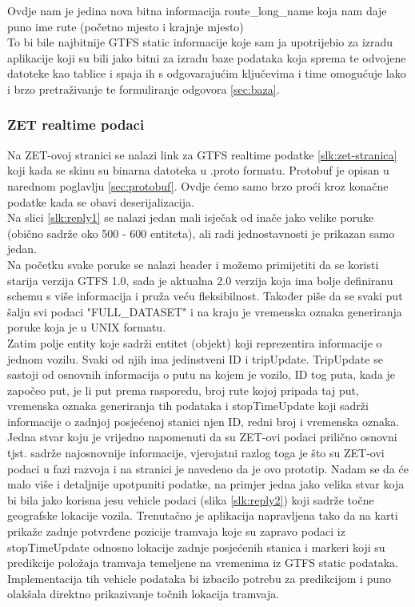 \documentclass[zavrsnirad]{fer}
\begin{document}
Ovdje nam je jedina nova bitna informacija route\_long\_name koja nam daje puno ime rute (početno mjesto i krajnje mjesto)\\
To bi bile najbitnije GTFS static informacije koje sam ja upotrijebio za izradu aplikacije koji su bili jako bitni za izradu baze podataka koja sprema te odvojene datoteke kao tablice i spaja ih s odgovarajućim ključevima i time omogućuje lako i brzo pretraživanje te formuliranje odgovora \ref{sec:baza}.

\newpage
\subsubsection{ZET realtime podaci}
Na ZET-ovoj stranici se nalazi link za GTFS realtime podatke \ref{slk:zet-stranica} koji kada se skinu su binarna datoteka u .proto formatu. Protobuf je opisan u narednom poglavlju \ref{sec:protobuf}. Ovdje ćemo samo brzo proći kroz konačne podatke kada se obavi deserijalizacija.\\
Na slici \ref{slk:reply1} se nalazi jedan mali isječak od inače jako velike poruke (obično sadrže oko 500 - 600 entiteta), ali radi jednostavnosti je prikazan samo jedan.\\
Na početku svake poruke se nalazi header i možemo primijetiti da se koristi starija verzija GTFS 1.0, sada je aktualna 2.0 verzija koja ima bolje definiranu schemu s više informacija i pruža veću fleksibilnost. Također piše da se svaki put šalju svi podaci "FULL\_DATASET" i na kraju je vremenska oznaka generiranja poruke koja je u UNIX formatu.\\
Zatim polje entity koje sadrži entitet (objekt) koji reprezentira informacije o jednom vozilu. Svaki od njih ima jedinstveni ID i tripUpdate. TripUpdate se sastoji od osnovnih informacija o putu na kojem je vozilo, ID tog puta, kada je započeo put, je li put prema rasporedu, broj rute kojoj pripada taj put, vremenska oznaka generiranja tih podataka i stopTimeUpdate koji sadrži informacije o zadnjoj posjećenoj stanici njen ID, redni broj i vremenska oznaka.\\
Jedna stvar koju je vrijedno napomenuti da su ZET-ovi podaci prilično osnovni tjst. sadrže najosnovnije informacije, vjerojatni razlog toga je što su ZET-ovi podaci u fazi razvoja i na stranici je navedeno da je ovo prototip. Nadam se da će malo više i detaljnije upotpuniti podatke, na primjer jedna jako velika stvar koja bi bila jako korisna jesu vehicle podaci (slika \ref{slk:reply2}) koji sadrže točne geografske lokacije vozila. Trenutačno je aplikacija napravljena tako da na karti prikaže zadnje potvrđene pozicije tramvaja koje su zapravo podaci iz stopTimeUpdate odnosno lokacije zadnje posjećenih stanica i markeri koji su predikcije položaja tramvaja temeljene na vremenima iz GTFS static podataka. Implementacija tih vehicle podataka bi izbacilo potrebu za predikcijom i puno olakšala direktno prikazivanje točnih lokacija tramvaja.
\end{document}

